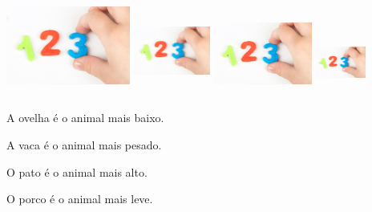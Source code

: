 \begin{escolha}
\begin{escolha}
\includegraphics[width=1.60383in,height=1.29919in]{media/image114.png}
\includegraphics[width=0.99316in,height=1.17006in]{media/image114.png}
\includegraphics[width=1.27263in,height=1.09078in]{media/image114.png}
\includegraphics[width=0.65433in,height=0.85550in]{media/image114.png}


\begin{escolha}
\item A ovelha é o animal mais baixo.

\item A vaca é o animal mais pesado.

\item O pato é o animal mais alto.

\item O porco é o animal mais leve.
\end{escolha}

\end{escolha}
\end{escolha}
